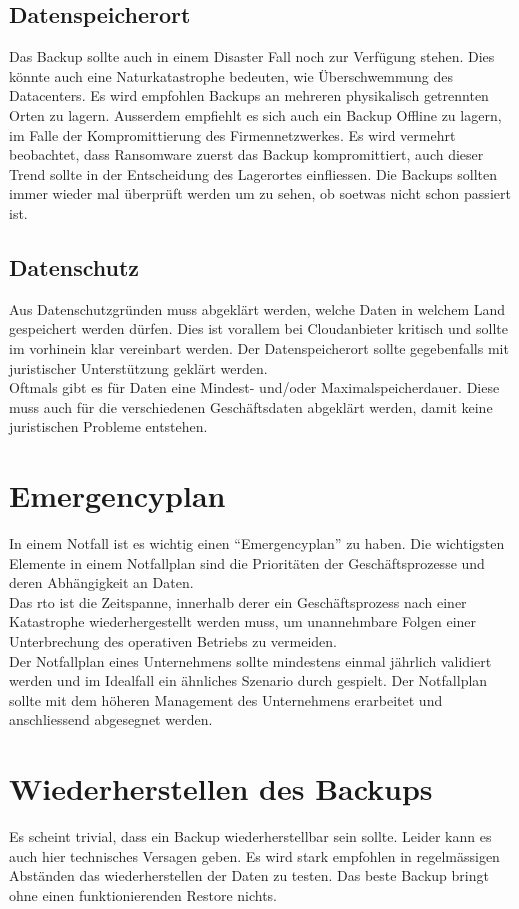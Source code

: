 \subsection{Datenspeicherort}
Das Backup sollte auch in einem Disaster Fall noch zur Verfügung stehen.
Dies könnte auch eine Naturkatastrophe bedeuten, wie Überschwemmung des Datacenters.
Es wird empfohlen Backups an mehreren physikalisch getrennten Orten zu lagern.
Ausserdem empfiehlt es sich auch ein Backup Offline zu lagern, im Falle der Kompromittierung des Firmennetzwerkes.
Es wird vermehrt beobachtet, dass Ransomware zuerst das Backup kompromittiert, auch dieser Trend sollte in der Entscheidung des Lagerortes einfliessen.
Die Backups sollten immer wieder mal überprüft werden um zu sehen, ob soetwas nicht schon passiert ist.



\subsection{Datenschutz}
Aus Datenschutzgründen muss abgeklärt werden, welche Daten in welchem Land gespeichert werden dürfen.
Dies ist vorallem bei Cloudanbieter kritisch und sollte im vorhinein klar vereinbart werden.
Der Datenspeicherort sollte gegebenfalls mit juristischer Unterstützung geklärt werden.\\

Oftmals gibt es für Daten eine Mindest- und/oder Maximalspeicherdauer. 
Diese muss auch für die verschiedenen Geschäftsdaten abgeklärt werden, damit keine juristischen Probleme entstehen. 

\section{Emergencyplan}
In einem Notfall ist es wichtig einen ``Emergencyplan'' zu haben.
Die wichtigsten Elemente in einem Notfallplan sind die Prioritäten der Geschäftsprozesse und deren Abhängigkeit an Daten.\\


Das \acrfull{rto} ist die Zeitspanne, innerhalb derer ein Geschäftsprozess nach einer Katastrophe wiederhergestellt werden muss, um unannehmbare Folgen einer Unterbrechung des operativen Betriebs zu vermeiden.\\

Der Notfallplan eines Unternehmens sollte mindestens einmal jährlich validiert werden und im Idealfall ein ähnliches Szenario durch gespielt.
Der Notfallplan sollte mit dem höheren Management des Unternehmens erarbeitet und anschliessend abgesegnet werden.


\section{Wiederherstellen des Backups}
Es scheint trivial, dass ein Backup wiederherstellbar sein sollte.
Leider kann es auch hier technisches Versagen geben.
Es wird stark empfohlen in regelmässigen Abständen das wiederherstellen der Daten zu testen.
Das beste Backup bringt ohne einen funktionierenden Restore nichts.
